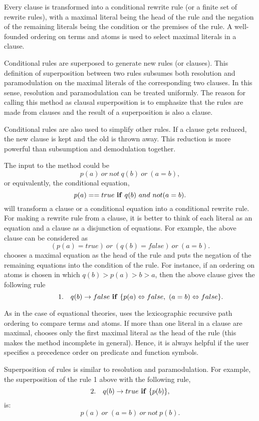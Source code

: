 Every clause is transformed into a conditional rewrite rule (or a
finite set of rewrite rules), with a maximal literal being the head
of the rule and the negation of the remaining literals being the
condition or the premises of the rule. A well-founded ordering on
terms and atoms is used to select maximal literals in a clause.

Conditional rules are superposed to generate new rules (or
clauses).  This definition of superposition between two rules
subsumes both resolution and paramodulation on the maximal
literals of the corresponding two clauses. In this sense,
resolution and paramodulation can be treated uniformly.  The
reason for calling this method as clausal superposition is to
emphasize that the rules are made from clauses and the result of
a superposition is also a clause.

Conditional rules are also used to simplify other rules.  If a
clause gets reduced, the new clause is kept and the old is thrown
away.  This reduction is more powerful than subsumption and
demodulation together.

The input to the method could be
                   \[ p(a) ~or~ not~ q(b)~ or~ (a = b), \]
or equivalently, the conditional equation,
                   \[ p(a) == true ~{\bf if} ~ q(b) ~and ~ not (a = b). \]
\RRL will transform a clause or a conditional equation into
a conditional rewrite rule. For making a rewrite rule 
from a clause, it is better to 
think of each literal as an equation and a clause as
a disjunction of equations. For example, the above clause can be considered as
                   \[ (p(a) = true) ~or~ (q(b) = false) ~or~ (a = b). \]
\RRL chooses a maximal 
equation as the head of the rule and puts the negation 
of the remaining equations into the condition of the rule.
For instance, if an ordering on atoms
is chosen in which $q(b) > p(a) > b > a$, then 
the above clause gives the following rule
              \[ ~~~~~~~~~1.  ~~~ q(b) \rightarrow false~ {\bf if} ~\{ p(a) \Leftrightarrow false,~  (a = b) \Leftrightarrow false \}. \]

As in the case of equational theories,
\RRL uses the lexicographic recursive
path ordering to compare terms and atoms.  If more than one
literal in a clause are maximal, \RRL chooses only the first
maximal literal as the head of the rule (this makes the method
incomplete in general). Hence, it is always helpful if the user
specifies a precedence order on predicate and function symbols.

Superposition of rules is similar to resolution and
paramodulation. For example, the superposition of the rule 1
above with the following rule,
     \[  2. ~~~ q(b) \rightarrow true  ~{\bf if}  ~\{ p(b) \}, \]
is:
                   \[ p(a) ~or~ (a = b) ~or~ not~ p(b). \]

